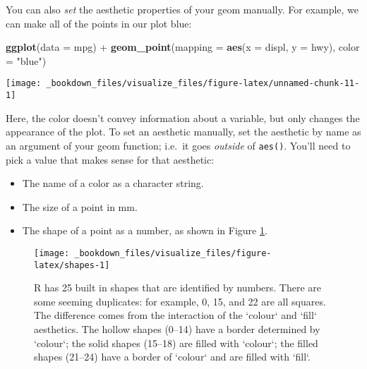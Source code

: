 \documentclass[]{book}
\newenvironment{Shaded}{\begin{snugshade}}{\end{snugshade}}
\newcommand{\KeywordTok}[1]{\textcolor[rgb]{0.13,0.29,0.53}{\textbf{{#1}}}}
\newcommand{\DataTypeTok}[1]{\textcolor[rgb]{0.13,0.29,0.53}{{#1}}}
\newcommand{\StringTok}[1]{\textcolor[rgb]{0.31,0.60,0.02}{{#1}}}
\newcommand{\NormalTok}[1]{{#1}}
\begin{document}
You can also \emph{set} the aesthetic properties of your geom manually.
For example, we can make all of the points in our plot blue:

\begin{Shaded}
\begin{Highlighting}[]
\KeywordTok{ggplot}\NormalTok{(}\DataTypeTok{data =} \NormalTok{mpg) +}\StringTok{ }
\StringTok{  }\KeywordTok{geom_point}\NormalTok{(}\DataTypeTok{mapping =} \KeywordTok{aes}\NormalTok{(}\DataTypeTok{x =} \NormalTok{displ, }\DataTypeTok{y =} \NormalTok{hwy), }\DataTypeTok{color =} \StringTok{"blue"}\NormalTok{)}
\end{Highlighting}
\end{Shaded}

\begin{center}\texttt{[image: \_bookdown\_files/visualize\_files/figure-latex/unnamed-chunk-11-1]} \end{center}

Here, the color doesn't convey information about a variable, but only
changes the appearance of the plot. To set an aesthetic manually, set
the aesthetic by name as an argument of your geom function; i.e.~it goes
\emph{outside} of \texttt{aes()}. You'll need to pick a value that makes
sense for that aesthetic:

\begin{itemize}
\item
  The name of a color as a character string.
\item
  The size of a point in mm.
\item
  The shape of a point as a number, as shown in Figure \ref{fig:shapes}.
\end{itemize}

\begin{figure}

{\centering \texttt{[image: \_bookdown\_files/visualize\_files/figure-latex/shapes-1]} 

}

\caption{R has 25 built in shapes that are identified by numbers. There are some seeming duplicates: for example, 0, 15, and 22 are all squares. The difference comes from the interaction of the `colour` and `fill` aesthetics. The hollow shapes (0--14) have a border determined by `colour`; the solid shapes (15--18) are filled with `colour`; the filled shapes (21--24) have a border of `colour` and are filled with `fill`.}\label{fig:shapes}
\end{figure}
\end{document}

